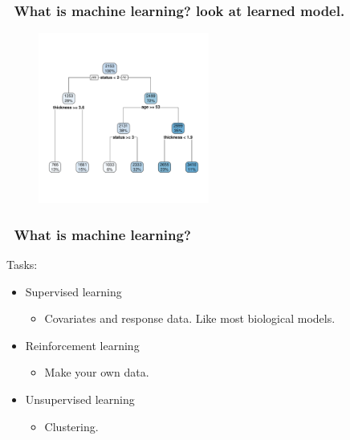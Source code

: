 \documentclass[handout, aspectratio = 169]{beamer}
\begin{document}
\begin{frame}
\frametitle{\insertframenumber~What is machine learning? look at learned model.}
\vspace{-4mm}
\begin{figure}
    \includegraphics[width = 0.5\textwidth]{rpart_tree.pdf}
\end{figure} 

\end{frame} 





\begin{frame}
\frametitle{\insertframenumber~What is machine learning?}
Tasks:
\begin{itemize}
\item Supervised learning
\begin{itemize}
\item Covariates and response data. Like most biological models.
\end{itemize}
\item Reinforcement learning
\begin{itemize}
\item Make your own data.
\end{itemize}
\item Unsupervised learning
\begin{itemize}
\item Clustering.
\end{itemize}
\end{itemize}
\end{frame} 
\end{document}
